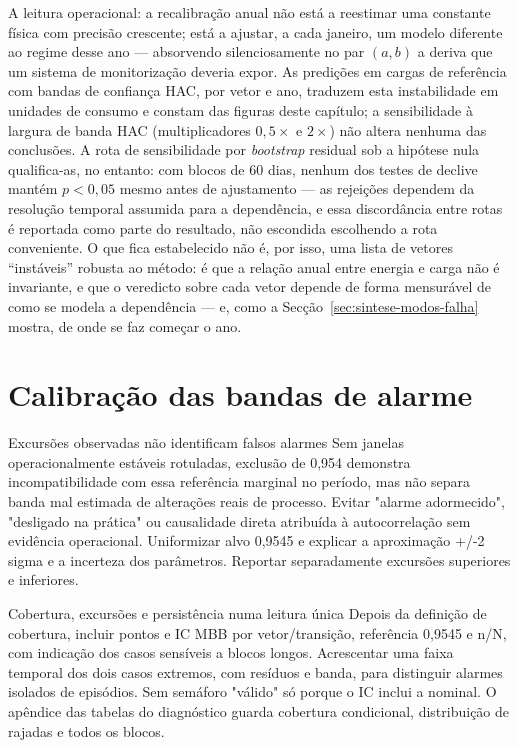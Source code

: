 A leitura operacional: a recalibração anual não está a reestimar uma constante
física com precisão crescente; está a ajustar, a cada janeiro, um modelo
diferente ao regime desse ano --- absorvendo silenciosamente no par $(a, b)$ a
deriva que um sistema de monitorização deveria expor. As predições em cargas
de referência com bandas de confiança HAC, por vetor e ano, traduzem esta
instabilidade em unidades de consumo e constam das figuras deste capítulo;
a sensibilidade à largura de banda HAC (multiplicadores $0{,}5\times$ e
$2\times$) não altera nenhuma das conclusões. A rota de sensibilidade por
\emph{bootstrap} residual sob a hipótese nula qualifica-as, no entanto: com
blocos de 60 dias, nenhum dos testes de declive mantém $p<0{,}05$ mesmo antes
de ajustamento --- as rejeições dependem da resolução temporal assumida para
a dependência, e essa discordância entre rotas é reportada como parte do
resultado, não escondida escolhendo a rota conveniente. O que fica
estabelecido não é, por isso, uma lista de vetores ``instáveis'' robusta ao
método: é que a relação anual entre energia e carga não é invariante, e que
o veredicto sobre cada vetor depende de forma mensurável de como se modela
a dependência --- e, como a Secção~\ref{sec:sintese-modos-falha} mostra, de
onde se faz começar o ano.

\section{Calibração das bandas de alarme}
\label{sec:calibracao}
{Excursões observadas não identificam falsos alarmes}
{Sem janelas operacionalmente estáveis rotuladas, exclusão de 0,954
demonstra incompatibilidade com essa referência marginal no período,
mas não separa banda mal estimada de alterações reais de processo.
Evitar "alarme adormecido", "desligado na prática" ou causalidade direta
atribuída à autocorrelação sem evidência operacional. Uniformizar alvo
0,9545 e explicar a aproximação +/-2 sigma e a incerteza dos parâmetros.
Reportar separadamente excursões superiores e inferiores.}%

{Cobertura, excursões e persistência numa leitura única}
{Depois da definição de cobertura, incluir pontos e IC MBB por
vetor/transição, referência 0,9545 e n/N, com indicação dos casos sensíveis
a blocos longos. Acrescentar uma faixa temporal dos dois casos extremos,
com resíduos e banda, para distinguir alarmes isolados de episódios.
Sem semáforo "válido" só porque o IC inclui a nominal. O apêndice das tabelas do diagnóstico
guarda cobertura condicional, distribuição de rajadas e todos os blocos.}%

